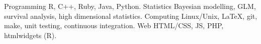 


\begin{cvskills}

\cvskill
{Programming} %
{R, C++, Ruby, Java, Python.} %
\cvskill
{Statistics} %
{Bayesian modelling, GLM, survival analysis, high dimensional statistics.} %
\cvskill
{Computing} %
{Linux/Unix, \LaTeX{}, git, make, unit testing, continuous integration.} %
\cvskill
{Web} %
{HTML/CSS, JS, PHP, htmlwidgets (R).} %

\end{cvskills}

